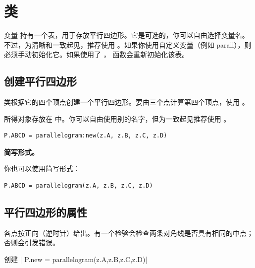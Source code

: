 \newpage
\section{ 类}
变量  持有一个表，用于存放平行四边形。它是可选的，你可以自由选择变量名。不过，为清晰和一致起见，推荐使用 。如果你使用自定义变量（例如 parall），则必须手动初始化它。如果使用了 ， 函数会重新初始化该表。


\subsection{创建平行四边形}
\label{sub:creating_a_parallelogram}

 类根据它的四个顶点创建一个平行四边形。要由三个点计算第四个顶点，使用 。

\medskip
所得对象存放在  中。你可以自由使用别的名字，但为一致起见推荐使用 。

\begin{mybox}
\begin{verbatim}
P.ABCD = parallelogram:new(z.A, z.B, z.C, z.D)
\end{verbatim}
\end{mybox}

\textbf{简写形式。}

你也可以使用简写形式：

\begin{mybox}
\begin{verbatim}
P.ABCD = parallelogram(z.A, z.B, z.C, z.D)
\end{verbatim}
\end{mybox}

\subsection{平行四边形的属性}

各点按正向（逆时针）给出。有一个检验会检查两条对角线是否具有相同的中点；否则会引发错误。

\begin{mybox}
创建 | P.new = parallelogram(z.A,z.B,z.C,z.D)|
\end{mybox}


